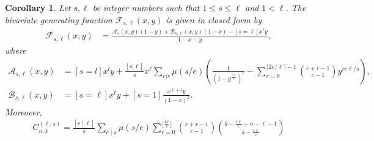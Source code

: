 \documentclass[12pt]{amsart}
\newtheorem{corollary}{Corollary}[section]
\begin{document}
\begin{corollary}
    Let $s,\ell$ be integer numbers such that $1\leq s\leq \ell$ and $1<\ell$. The bivariate generating function $\mathcal{F}_{s,\ell}(x, y)$ is given in closed form by 
    \begin{align}
    \label{eq:genFunc}
        \mathcal{F}_{s,\ell}(x, y) &= \frac{\mathcal{A}_s(x,y)(1-y) + \mathcal{B}_{s,\ell}(x, y)(1-x) - [s=\ell]x^{\ell}y}{1-x-y},
    \end{align}
    where 
    \begin{align*}
        \mathcal{A}_{s,\ell}(x, y) &= [s=l]x^l y +  \frac{[s |  \ell]}{s} x^\ell \sum_{e | s} \mu(s/e)  \left(\frac{1}{(1-y^{\frac{e\ell}{s}})^e} - \sum_{r=0}^{\lceil2e/\ell\rceil - 1} \binom{e+r-1}{e-1} y^{re\ell/s}\right),\,\\
        \mathcal{B}_{s,\ell}(x, y) &= [s=\ell] x^\ell y + [s=1] \frac{x^{\ell+1}y}{(1-x)^2}.
    \end{align*}
    Moreover, 
    \begin{align}
    \label{eq:ExactForm}
        C^{(\ell,s)}_{n,k}=\displaystyle \frac{[s \mid \ell]}{s}\sum _{e\mid s}\mu(s/e)\sum _{r=0}^{\lfloor\frac{ke}{\ell}\rfloor}\binom{e+r-1}{e-1}\binom{k-\frac{r\ell}{e}+n-\ell-1}{k-\frac{r\ell}{e}}
    \end{align}
\end{corollary}
\end{document}
